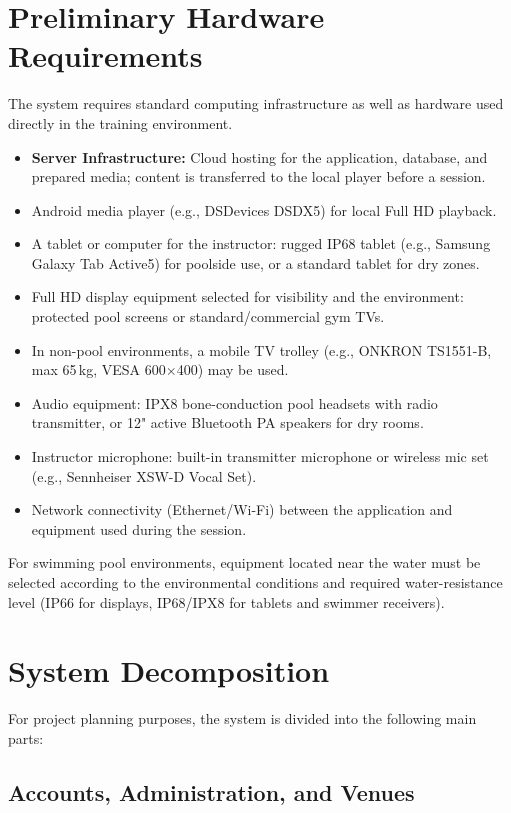 \documentclass[a4paper,11pt]{article}
\begin{document}
\section{Preliminary Hardware Requirements}

The system requires standard computing infrastructure as well as hardware used directly in the training environment.

\begin{itemize}
    \item \textbf{Server Infrastructure:} Cloud hosting for the application, database, and prepared media; content is transferred to the local player before a session.
    \item Android media player (e.g., DSDevices DSDX5) for local Full HD playback.
    \item A tablet or computer for the instructor: rugged IP68 tablet (e.g., Samsung Galaxy Tab Active5) for poolside use, or a standard tablet for dry zones.
    \item Full HD display equipment selected for visibility and the environment: protected pool screens or standard/commercial gym TVs.
    \item In non-pool environments, a mobile TV trolley (e.g., ONKRON TS1551-B, max 65\,kg, VESA 600$\times$400) may be used.
    \item Audio equipment: IPX8 bone-conduction pool headsets with radio transmitter, or 12" active Bluetooth PA speakers for dry rooms.
    \item Instructor microphone: built-in transmitter microphone or wireless mic set (e.g., Sennheiser XSW-D Vocal Set).
    \item Network connectivity (Ethernet/Wi-Fi) between the application and equipment used during the session.
\end{itemize}

For swimming pool environments, equipment located near the water must be selected according to the environmental conditions and required water-resistance level (IP66 for displays, IP68/IPX8 for tablets and swimmer receivers).

\section{System Decomposition}

For project planning purposes, the system is divided into the following main parts:

\subsection{Accounts, Administration, and Venues}
\end{document}

